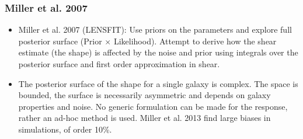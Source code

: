 \documentclass{beamer}
\begin{document}
\frame
{
    \frametitle{Miller et al. 2007}

    \begin{itemize}

        \item Miller et al. 2007 (LENSFIT): Use priors on the parameters and
            explore full posterior surface (Prior $\times$ Likelihood).
            Attempt to derive how the shear estimate (the shape) is affected by
            the noise and prior using integrals over the posterior surface and
            first order approximation in shear.

        \item The posterior surface of the shape for a single galaxy is
            complex.  The space is bounded, the surface is necessarily
            asymmetric and depends on galaxy properties and noise. No generic
            formulation can be made for the response, rather an ad-hoc method
            is used.  Miller et al. 2013 find large biases in simulations, of
            order 10\%.
        
    \end{itemize}
}
\end{document}

